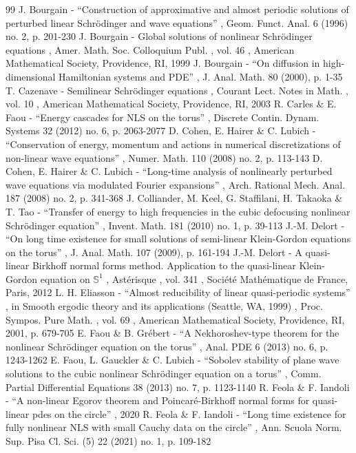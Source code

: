 \documentclass[11pt]{article}
\theoremstyle{definition}
\begin{document}
\begin{thebibliography}{99}
 J. Bourgain - “Construction of approximative and almost periodic solutions of perturbed linear Schrödinger and wave equations” , Geom. Funct. Anal. 6 (1996) no. 2, p. 201-230
 J. Bourgain - Global solutions of nonlinear Schrödinger equations , Amer. Math. Soc. Colloquium Publ. , vol. 46 , American Mathematical Society, Providence, RI, 1999
 J. Bourgain - “On diffusion in high-dimensional Hamiltonian systems and PDE” , J. Anal. Math. 80 (2000), p. 1-35
 T. Cazenave - Semilinear Schrödinger equations , Courant Lect. Notes in Math. , vol. 10 , American Mathematical Society, Providence, RI, 2003
 R. Carles \& E. Faou - “Energy cascades for NLS on the torus” , Discrete Contin. Dynam. Systems 32 (2012) no. 6, p. 2063-2077
 D. Cohen, E. Hairer \& C. Lubich - “Conservation of energy, momentum and actions in numerical discretizations of non-linear wave equations” , Numer. Math. 110 (2008) no. 2, p. 113-143
 D. Cohen, E. Hairer \& C. Lubich - “Long-time analysis of nonlinearly perturbed wave equations via modulated Fourier expansions” , Arch. Rational Mech. Anal. 187 (2008) no. 2, p. 341-368
 J. Colliander, M. Keel, G. Staffilani, H. Takaoka \& T. Tao - “Transfer of energy to high frequencies in the cubic defocusing nonlinear Schrödinger equation” , Invent. Math. 181 (2010) no. 1, p. 39-113
 J.-M. Delort - “On long time existence for small solutions of semi-linear Klein-Gordon equations on the torus” , J. Anal. Math. 107 (2009), p. 161-194
 J.-M. Delort - A quasi-linear Birkhoff normal forms method. Application to the quasi-linear Klein-Gordon equation on $\mathbb{S}^1$ , Astérisque , vol. 341 , Société Mathématique de France, Paris, 2012
 L. H. Eliasson - “Almost reducibility of linear quasi-periodic systems” , in Smooth ergodic theory and its applications (Seattle, WA, 1999) , Proc. Sympos. Pure Math. , vol. 69 , American Mathematical Society, Providence, RI, 2001, p. 679-705
 E. Faou \& B. Grébert - “A Nekhoroshev-type theorem for the nonlinear Schrödinger equation on the torus” , Anal. PDE 6 (2013) no. 6, p. 1243-1262
 E. Faou, L. Gauckler \& C. Lubich - “Sobolev stability of plane wave solutions to the cubic nonlinear Schrödinger equation on a torus” , Comm. Partial Differential Equations 38 (2013) no. 7, p. 1123-1140
 R. Feola \& F. Iandoli - “A non-linear Egorov theorem and Poincaré-Birkhoff normal forms for quasi-linear pdes on the circle” , 2020
 R. Feola \& F. Iandoli - “Long time existence for fully nonlinear NLS with small Cauchy data on the circle” , Ann. Scuola Norm. Sup. Pisa Cl. Sci. (5) 22 (2021) no. 1, p. 109-182

\end{thebibliography}
\end{document}

